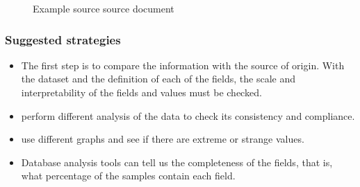 \begin{figure}[ht]
    \centering
    \caption{Example source source document}
\end{figure}

\subsubsection*{Suggested strategies} 

\begin{itemize}
    \item The first step is to compare the information with the source of origin. With the dataset and the definition
    of each of the fields, the scale and interpretability of the fields and values must be checked.
    \item perform different analysis of the data to check its consistency and compliance.
    \item use different graphs and see if there are extreme or strange values.
    \item Database analysis tools can tell us the completeness of the fields, that is, what percentage of the
    samples contain each field.
\end{itemize}

